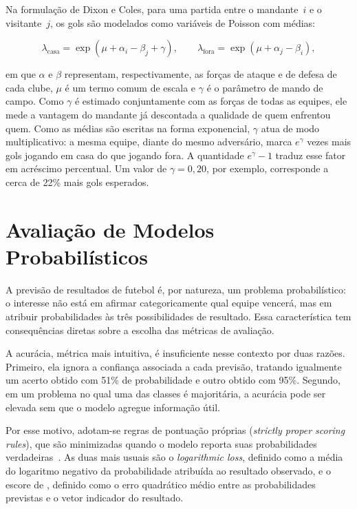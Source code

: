 Na formulação de Dixon e Coles, para uma partida entre o mandante~$i$ e o
visitante~$j$, os gols são modelados como variáveis de Poisson com médias:

\begin{equation}\label{eq:dixon-coles}
  \lambda_{\text{casa}} = \exp(\mu + \alpha_i - \beta_j + \gamma),
  \qquad
  \lambda_{\text{fora}} = \exp(\mu + \alpha_j - \beta_i),
\end{equation}

\noindent em que $\alpha$ e $\beta$ representam, respectivamente, as forças de
ataque e de defesa de cada clube, $\mu$ é um termo comum de escala e $\gamma$ é o
parâmetro de mando de campo. Como $\gamma$ é estimado conjuntamente com as forças
de todas as equipes, ele mede a vantagem do mandante já descontada a qualidade de
quem enfrentou quem. Como as médias são escritas na forma exponencial, $\gamma$ atua de modo
multiplicativo: a mesma equipe, diante do mesmo adversário, marca $e^{\gamma}$
vezes mais gols jogando em casa do que jogando fora. A quantidade
$e^{\gamma} - 1$ traduz esse fator em acréscimo percentual. Um valor de
$\gamma = 0{,}20$, por exemplo, corresponde a cerca de 22\% mais gols
esperados.

\section{Avaliação de Modelos Probabilísticos}\label{sec:avaliacao}

A previsão de resultados de futebol é, por natureza, um problema probabilístico:
o interesse não está em afirmar categoricamente qual equipe vencerá, mas em
atribuir probabilidades às três possibilidades de resultado. Essa característica
tem consequências diretas sobre a escolha das métricas de avaliação.

A acurácia, métrica mais intuitiva, é insuficiente nesse contexto por duas
razões. Primeiro, ela ignora a confiança associada a cada previsão, tratando
igualmente um acerto obtido com 51\% de probabilidade e outro obtido com 95\%.
Segundo, em um problema no qual uma das classes é majoritária, a acurácia pode
ser elevada sem que o modelo agregue informação útil.

Por esse motivo, adotam-se regras de pontuação próprias (\textit{strictly proper
scoring rules}), que são minimizadas quando o modelo reporta suas probabilidades
verdadeiras~\cite{GneitingRaftery2007}. As duas mais usuais são o \textit{logarithmic
loss}, definido como a média do logaritmo negativo da probabilidade atribuída ao
resultado observado, e o escore de , definido como o erro
quadrático médio entre as probabilidades previstas e o vetor indicador do
resultado.

